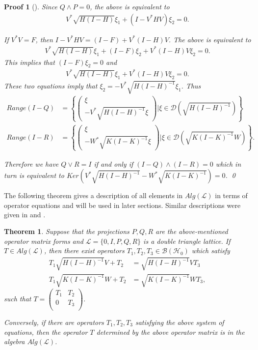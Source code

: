 \documentclass{jaums}
\theoremstyle{thmit} %
\newtheorem{theorem}{Theorem}[section]
\theoremstyle{thmrm} %
\newtheorem*{oldproof}{Proof}
\renewenvironment{proof}[1][{}]{\begin{oldproof}[#1]}{\qed\end{oldproof}}
\begin{document}
\begin{proof}
Since $Q \wedge P = 0$, the above is equivalent to
\begin{align*}
V^{*}\sqrt{H(I-H)}\xi_1 + (I-V^{*}HV)\xi_2 = 0.
\end{align*}

If $V^{*}V = F$, then
$I- V^{*}HV = (I-F) + V^{*}(I-H)V$. The above is equivalent to
\begin{align*}
V^{*}\sqrt{H(I-H)}\xi_1 + (I-F)\xi_2 + V^{*}(I-H)V\xi_2 = 0.
\end{align*}
This implies that $(I-F)\xi_2 = 0$ and
\begin{align*}
V^{*}\sqrt{H(I-H)}\xi_1 + V^{*}(I-H)V\xi_2 = 0.
\end{align*}
These two equations imply that $\xi_2 = -V^{*}\sqrt{H(I-H)^{-1}}\xi_1$.
Thus
\begin{align*}
Range(I-Q) &= \left\{
\begin{pmatrix}
\xi \\
-V^{*}\sqrt{H(I-H)^{-1}}\xi
\end{pmatrix} | \xi \in \mathcal{D}(\sqrt{H(I-H)^{-1}}) \right\} \\
Range(I-R) &= \left\{
\begin{pmatrix}
\xi \\
-W^{*}\sqrt{K(I-K)^{-1}}\xi
\end{pmatrix} | \xi \in \mathcal{D}(\sqrt{K(I-K)^{-1}}W) \right\}.
\end{align*}

Therefore we have $Q\vee R = I$ if and only if $(I-Q)\wedge (I-R)=0$ which in
turn is equivalent to
$Ker(V^{*}\sqrt{H(I-H)^{-1}} - W^{*}\sqrt{K(I-K)^{-1}}) = 0$.
\end{proof}

The following theorem gives a description of all elements in $Alg(\mathcal{L})$
in terms of operator equations and will be used in later sections. Similar
descriptions were given in \cite{[GY]} and \cite{[GY2]}.


\begin{theorem} Suppose that the projections $P,Q,R$ are the above-mentioned
operator matrix forms and $\mathcal{L}=\{0,I,P,Q,R\}$ is a double triangle
lattice.
If $T\in Alg(\mathcal{L})$, then there exist operators
$T_1,T_2,T_3\in\mathcal{B}(\mathcal{H}_0)$ which satisfy
\begin{align}
T_1\sqrt{H(I-H)^{-1}}V+T_2 &= \sqrt{H(I-H)^{-1}}VT_3\\
T_1\sqrt{K(I-K)^{-1}}W+T_2 &= \sqrt{K(I-K)^{-1}}WT_3,
\end{align} such that $T=\left(
\begin{array}{cc}
 T_1 & T_2 \\
 0   & T_3 \\
 \end{array}
 \right)$.

Conversely, if there are operators $T_1,T_2,T_3$ satisfying the above system of
equations, then the operator $T$ determined by the above operator matrix is in
the algebra $Alg(\mathcal{L})$.
\end{theorem}
\end{document}

